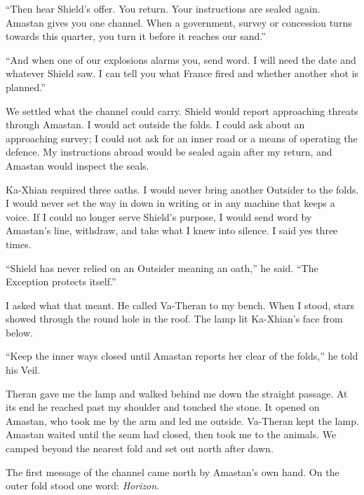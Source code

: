 ``Then hear Shield's offer. You return. Your instructions are sealed again. Amastan gives you one channel. When a government, survey or concession turns towards this quarter, you turn it before it reaches our sand.''\par

``And when one of our explosions alarms you, send word. I will need the date and whatever Shield saw. I can tell you what France fired and whether another shot is planned.''\par

We settled what the channel could carry. Shield would report approaching threats through Amastan. I would act outside the folds. I could ask about an approaching survey; I could not ask for an inner road or a means of operating the defence. My instructions abroad would be sealed again after my return, and Amastan would inspect the seals.\par

Ka-Xhian required three oaths. I would never bring another Outsider to the folds. I would never set the way in down in writing or in any machine that keeps a voice. If I could no longer serve Shield's purpose, I would send word by Amastan's line, withdraw, and take what I knew into silence. I said yes three times.\par

``Shield has never relied on an Outsider meaning an oath,'' he said. ``The Exception protects itself.''\par

I asked what that meant. He called Va-Theran to my bench. When I stood, stars showed through the round hole in the roof. The lamp lit Ka-Xhian's face from below.\par

``Keep the inner ways closed until Amastan reports her clear of the folds,'' he told his Veil.\par

Theran gave me the lamp and walked behind me down the straight passage. At its end he reached past my shoulder and touched the stone. It opened on Amastan, who took me by the arm and led me outside. Va-Theran kept the lamp. Amastan waited until the seam had closed, then took me to the animals. We camped beyond the nearest fold and set out north after dawn.\par

The first message of the channel came north by Amastan's own hand. On the outer fold stood one word: \emph{Horizon}.\par

